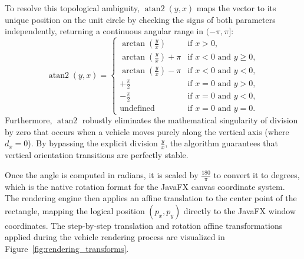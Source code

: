 \documentclass[../report_main.tex]{subfiles}
\begin{document}
To resolve this topological ambiguity, $\operatorname{atan2}(y, x)$ maps the vector to its unique position on the unit circle by checking the signs of both parameters independently, returning a continuous angular range in $(-\pi, \pi]$:
\begin{equation}
    \operatorname{atan2}(y, x) = \begin{cases}
        \arctan\left(\frac{y}{x}\right) & \text{if } x > 0, \\
        \arctan\left(\frac{y}{x}\right) + \pi & \text{if } x < 0 \text{ and } y \geq 0, \\
        \arctan\left(\frac{y}{x}\right) - \pi & \text{if } x < 0 \text{ and } y < 0, \\
        +\frac{\pi}{2} & \text{if } x = 0 \text{ and } y > 0, \\
        -\frac{\pi}{2} & \text{if } x = 0 \text{ and } y < 0, \\
        \text{undefined} & \text{if } x = 0 \text{ and } y = 0.
    \end{cases}
\end{equation}
Furthermore, $\operatorname{atan2}$ robustly eliminates the mathematical singularity of division by zero that occurs when a vehicle moves purely along the vertical axis (where $d_x = 0$). By bypassing the explicit division $\frac{y}{x}$, the algorithm guarantees that vertical orientation transitions are perfectly stable. 

Once the angle is computed in radians, it is scaled by $\frac{180}{\pi}$ to convert it to degrees, which is the native rotation format for the JavaFX canvas coordinate system. The rendering engine then applies an affine translation to the center point of the rectangle, mapping the logical position $(p_x, p_y)$ directly to the JavaFX window coordinates. The step-by-step translation and rotation affine transformations applied during the vehicle rendering process are visualized in Figure~\ref{fig:rendering_transforms}.
\end{document}
